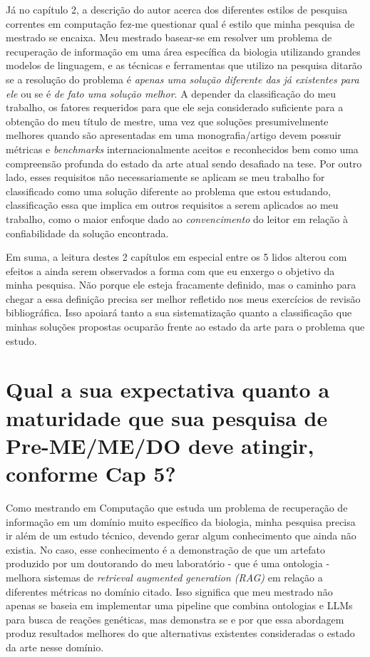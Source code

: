 \documentclass{article}
\begin{document}
Já no capítulo 2, a descrição do autor acerca dos diferentes estilos de pesquisa correntes em computação fez-me questionar qual é estilo que minha pesquisa de mestrado se encaixa. Meu mestrado basear-se em resolver um problema de recuperação de informação em uma área específica da biologia utilizando grandes modelos de linguagem, e as técnicas e ferramentas que utilizo na pesquisa ditarão se a resolução do problema é \textit{apenas uma solução diferente das já existentes para ele} ou se é \textit{de fato uma solução melhor}. A depender da classificação do meu trabalho, os fatores requeridos para que ele seja considerado suficiente para a obtenção do meu título de mestre, uma vez que soluções presumivelmente melhores quando são apresentadas em uma monografia/artigo devem possuir métricas e \textit{benchmarks} internacionalmente aceitos e reconhecidos bem como uma compreensão profunda do estado da arte atual sendo desafiado na tese. Por outro lado, esses requisitos não necessariamente se aplicam se meu trabalho for classificado como uma solução diferente ao problema que estou estudando, classificação essa que implica em outros requisitos a serem aplicados ao meu trabalho, como o maior enfoque dado ao \textit{convencimento} do leitor em relação à confiabilidade da solução encontrada.

Em suma, a leitura destes 2 capítulos em especial entre os 5 lidos alterou com efeitos a ainda serem observados a forma com que eu enxergo o objetivo da minha pesquisa. Não porque ele esteja fracamente definido, mas o  caminho para chegar a essa definição precisa ser melhor refletido nos meus exercícios de revisão bibliográfica. Isso apoiará tanto a sua sistematização quanto a classificação que minhas soluções propostas ocuparão frente ao estado da arte para o problema que estudo.



\section*{Qual a sua expectativa quanto a maturidade que sua pesquisa de Pre-ME/ME/DO deve atingir, conforme Cap 5? } %


Como mestrando em Computação que estuda um problema de recuperação de informação em um domínio muito específico da biologia, minha pesquisa precisa ir além de um estudo técnico, devendo gerar algum conhecimento que ainda não existia. No caso, esse conhecimento é a demonstração de que um artefato produzido por um doutorando do meu laboratório - que é uma ontologia -  melhora sistemas de \textit{retrieval augmented generation (RAG)} em relação a diferentes métricas no domínio citado. Isso significa que meu mestrado não apenas se baseia em implementar uma pipeline que combina ontologias e LLMs para busca de reações genéticas, mas demonstra se e por que essa abordagem produz resultados melhores do que alternativas existentes consideradas o estado da arte nesse domínio.
\end{document}
